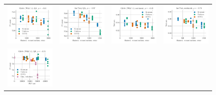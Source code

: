 \begin{figure}
	\centering
	\begin{tabular}{@{\hskip -0.0in}c@{\hskip -0.0in}c@{\hskip -0.0in}c@{\hskip -0.0in}c@{\hskip -0.0in}}
		\includegraphics[width=.245\linewidth]{figures/glove400k_qa_best-f1_vs_embed-frob-error_linx_stoc.pdf} &
		\includegraphics[width=.245\linewidth]{figures/fasttext1m_qa_best-f1_vs_embed-frob-error_linx_stoc.pdf} &
		\includegraphics[width=.245\linewidth]{figures/glove400k_sentiment_sst_test-acc_vs_embed-frob-error_linx_stoc.pdf} &
		\includegraphics[width=.245\linewidth]{figures/fasttext1m_sentiment_sst_test-acc_vs_embed-frob-error_linx_stoc.pdf} \\
		\includegraphics[width=.245\linewidth]{figures/glove400k_qa_best-f1_vs_gram-large-dim-frob-error_linx_stoc.pdf} &

\end{tabular}
\end{figure}
